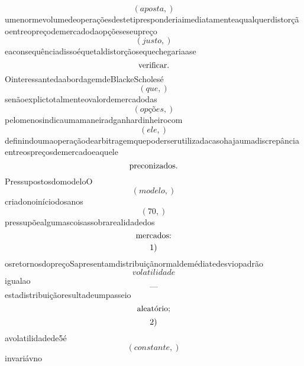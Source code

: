 \documentclass{article}
\begin{document}
\begin{equation}
\left( aposta,\right)
\end{equation}umenormevolumedeoperaçõesdestetipresponderiaimediatamenteaqualquerdistorçãoentreopreçodemercadodaopçõeseseupreço\begin{equation}
\left( justo,\right)
\end{equation}eaconsequênciadissoéquetaldistorçãosequechegariaase\begin{equation}
$verificar.$
\end{equation}OinteressantedaabordagemdeBlackeScholesé\begin{equation}
\left( que,\right)
\end{equation}senãoexplictotalmenteovalordemercadodas\begin{equation}
\left( opções,\right)
\end{equation}pelomenosindicaumamaneiradganhardinheirocom\begin{equation}
\left( ele,\right)
\end{equation}definindoumaoperaçãodearbitragemquepoderserutilizadacasohajaumadiscrepânciaentreospreçosdemercadoeaquele\begin{equation}
$preconizados.$
\end{equation}PressupostosdomodeloO\begin{equation}
\left( modelo,\right)
\end{equation}criadonoiníciodosanos\begin{equation}
\left( 70,\right)
\end{equation}pressupõealgumascoisassobrarealidadedos\begin{equation}
$mercados:$
\end{equation}\begin{equation}
$1)$
\end{equation}osretornosdopreçoSapresentamdistribuiçãnormaldemédiatedesviopadrão\begin{equation}
volatilidade
\end{equation}igualao\begin{equation}
—
\end{equation}estadistribuiçãoresultadeumpasseio\begin{equation}
$aleatório;$
\end{equation}\begin{equation}
$2)$
\end{equation}avolatilidadede5é\begin{equation}
\left( constante,\right)
\end{equation}invariávno\begin{equation}

\end{equation}
\end{document}
